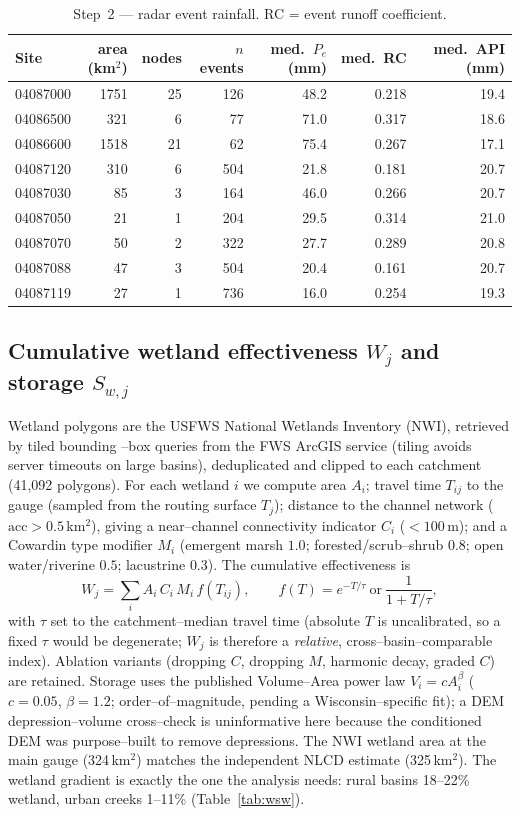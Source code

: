 \documentclass[11pt]{article}
\newcommand{\Wj}{W_{j}}
\newcommand{\Swj}{S_{w,j}}
\begin{document}
\begin{table}[htbp]\centering
\caption{Step~2 --- radar event rainfall. RC = event runoff coefficient.}
\label{tab:rain}
\small
\begin{tabular}{lrrrrrr}
\toprule
Site & area (km$^2$) & nodes & $n$ events & med.\ $P_e$ (mm) & med.\ RC & med.\ API (mm) \\
\midrule
04087000 & 1751 & 25 & 126 & 48.2 & 0.218 & 19.4 \\
04086500 & 321  & 6  & 77  & 71.0 & 0.317 & 18.6 \\
04086600 & 1518 & 21 & 62  & 75.4 & 0.267 & 17.1 \\
04087120 & 310  & 6  & 504 & 21.8 & 0.181 & 20.7 \\
04087030 & 85   & 3  & 164 & 46.0 & 0.266 & 20.7 \\
04087050 & 21   & 1  & 204 & 29.5 & 0.314 & 21.0 \\
04087070 & 50   & 2  & 322 & 27.7 & 0.289 & 20.8 \\
04087088 & 47   & 3  & 504 & 20.4 & 0.161 & 20.7 \\
04087119 & 27   & 1  & 736 & 16.0 & 0.254 & 19.3 \\
\bottomrule
\end{tabular}
\end{table}

\subsection{Cumulative wetland effectiveness $\Wj$ and storage $\Swj$}
Wetland polygons are the USFWS National Wetlands Inventory (NWI), retrieved by tiled bounding
--box queries from the FWS ArcGIS service (tiling avoids server timeouts on large basins),
deduplicated and clipped to each catchment (41{,}092 polygons). For each wetland $i$ we compute
area $A_i$; travel time $T_{ij}$ to the gauge (sampled from the routing surface $T_{j}$);
distance to the channel network ($\mathrm{acc}>0.5$\,km$^2$), giving a near--channel
connectivity indicator $C_i$ ($<100$\,m); and a Cowardin type modifier $M_i$ (emergent marsh
$1.0$; forested/scrub--shrub $0.8$; open water/riverine $0.5$; lacustrine $0.3$). The
cumulative effectiveness is
\begin{equation}
\Wj=\sum_{i} A_i\, C_i\, M_i\, f(T_{ij}), \qquad
f(T)=e^{-T/\tau}\ \text{or}\ \frac{1}{1+T/\tau},
\end{equation}
with $\tau$ set to the catchment--median travel time (absolute $T$ is uncalibrated, so a fixed
$\tau$ would be degenerate; $\Wj$ is therefore a \emph{relative}, cross--basin--comparable
index). Ablation variants (dropping $C$, dropping $M$, harmonic decay, graded $C$) are retained.
Storage uses the published Volume--Area power law $V_i=cA_i^{\beta}$ ($c=0.05$, $\beta=1.2$;
order--of--magnitude, pending a Wisconsin--specific fit); a DEM depression--volume cross--check
is uninformative here because the conditioned DEM was purpose--built to remove depressions.
The NWI wetland area at the main gauge (324\,km$^2$) matches the independent NLCD estimate
(325\,km$^2$). The wetland gradient is exactly the one the analysis needs: rural basins
18--22\% wetland, urban creeks 1--11\% (Table~\ref{tab:wsw}).
\end{document}
